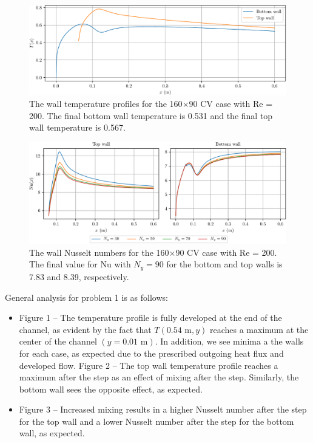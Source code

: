 \documentclass{article}
\begin{document}
\begin{figure}[H]
	\centering
	\includegraphics[width=0.9\linewidth]{../results/1b_Twall}
	\caption{The wall temperature profiles for the 160$\times$90 CV case with Re = 200. The final bottom wall temperature is 0.531 and the final top wall temperature is 0.567.}
	\label{fig:1b_Twall}
\end{figure}

\begin{figure}[H]
	\centering
	\includegraphics[width=0.9\linewidth]{../results/1c_Nu}
	\caption{The wall Nusselt numbers for the 160$\times$90 CV case with Re = 200. The final value for Nu with $N_y = 90$ for the bottom and top walls is 7.83 and 8.39, respectively.}
	\label{fig:1c_Nu}
\end{figure}

General analysis for problem 1 is as follows:
\begin{itemize}
	\item Figure 1 -- The temperature profile is fully developed at the end of the channel, as evident by the fact that $T(0.54\text{~m}, y)$ reaches a maximum at the center of the channel $(y = 0.01\text{~m})$. In addition, we see minima a the walls for each case, as expected due to the prescribed outgoing heat flux and developed flow. Figure 2 -- The top wall temperature profile reaches a maximum after the step as an effect of mixing after the step. Similarly, the bottom wall sees the opposite effect, as expected.
	\item Figure 3 -- Increased mixing results in a higher Nusselt number after the step for the top wall and a lower Nusselt number after the step for the bottom wall, as expected.
\end{itemize}
\end{document}
